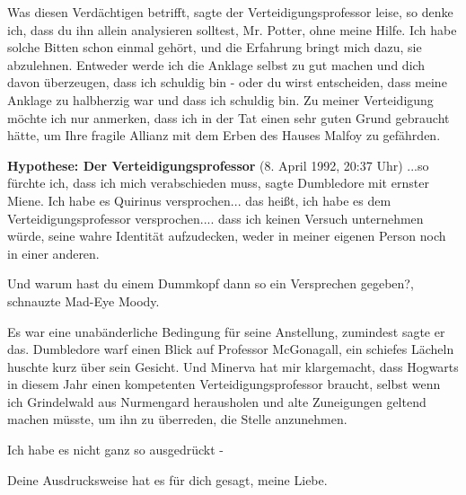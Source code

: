\glqq Was diesen Verdächtigen betrifft\grqq{}, sagte der Verteidigungsprofessor
leise, \glqq so denke ich, dass du ihn allein analysieren solltest, Mr. Potter,
ohne meine Hilfe. Ich habe solche Bitten schon einmal gehört, und die Erfahrung
bringt mich dazu, sie abzulehnen. Entweder werde ich die Anklage selbst zu gut
machen und dich davon überzeugen, dass ich schuldig bin - oder du wirst
entscheiden, dass meine Anklage zu halbherzig war und dass ich schuldig bin. Zu
meiner Verteidigung möchte ich nur anmerken, dass ich in der Tat einen sehr
guten Grund gebraucht hätte, um Ihre fragile Allianz mit dem Erben des Hauses
Malfoy zu gefährden.\grqq{}

\textbf{Hypothese: Der Verteidigungsprofessor }(8. April 1992, 20:37 Uhr) \glqq
...so fürchte ich, dass ich mich verabschieden muss\grqq{}, sagte Dumbledore mit
ernster Miene. \glqq Ich habe es Quirinus versprochen... das heißt, ich habe es
dem Verteidigungsprofessor versprochen.... dass ich keinen Versuch unternehmen
würde, seine wahre Identität aufzudecken, weder in meiner eigenen Person noch in
einer anderen.\grqq{}

\glqq Und warum hast du einem Dummkopf dann so ein Versprechen gegeben?\grqq{},
schnauzte Mad-Eye Moody.

\glqq Es war eine unabänderliche Bedingung für seine Anstellung, zumindest sagte
er das.\grqq{} Dumbledore warf einen Blick auf Professor McGonagall, ein
schiefes Lächeln huschte kurz über sein Gesicht. \glqq Und Minerva hat mir
klargemacht, dass Hogwarts in diesem Jahr einen kompetenten
Verteidigungsprofessor braucht, selbst wenn ich Grindelwald aus Nurmengard
herausholen und alte Zuneigungen geltend machen müsste, um ihn zu überreden, die
Stelle anzunehmen.\grqq{}

\glqq Ich habe es nicht ganz so ausgedrückt -\grqq{}

\glqq Deine Ausdrucksweise hat es für dich gesagt, meine Liebe.\grqq{}

